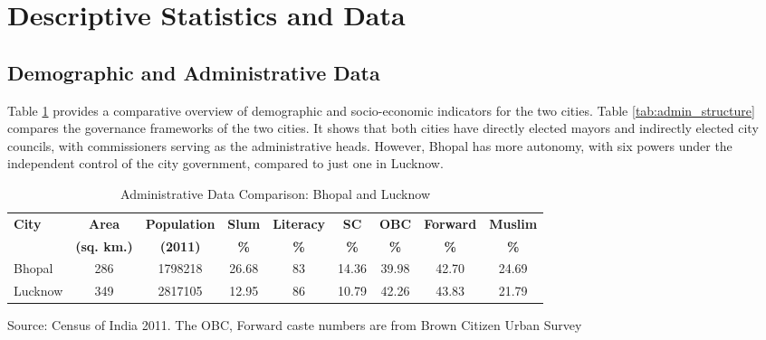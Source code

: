 \section{Descriptive Statistics and Data}

\subsection{Demographic and Administrative Data}

Table \ref{tab:admin_data} provides a comparative overview of demographic and socio-economic indicators for the two cities. Table \ref{tab:admin_structure} compares the governance frameworks of the two cities. It shows that both cities have directly elected mayors and indirectly elected city councils, with commissioners serving as the administrative heads. However, Bhopal has more autonomy, with six powers under the independent control of the city government, compared to just one in Lucknow.

\begin{table}[ht]
\centering
\caption{Administrative Data Comparison: Bhopal and Lucknow}
\label{tab:admin_data}
\begin{tabular}{|l|c|c|c|c|c|c|c|c|}
\hline
\textbf{City} & \textbf{Area} & \textbf{Population} & \textbf{Slum} & \textbf{Literacy} & \textbf{SC} & \textbf{OBC} & \textbf{Forward} & \textbf{Muslim} \\
 & \textbf{(sq. km.)} & \textbf{(2011)} & \textbf{\%} & \textbf{\%} & \textbf{\%} & \textbf{\%} & \textbf{\%} & \textbf{\%} \\
\hline
Bhopal & 286 & 1798218 & 26.68 & 83 & 14.36 & 39.98 & 42.70 & 24.69 \\
\hline
Lucknow & 349 & 2817105 & 12.95 & 86 & 10.79 & 42.26 & 43.83 & 21.79 \\
\hline
\end{tabular}
\raggedright
\small Source: Census of India 2011. The OBC, Forward caste numbers are from Brown Citizen Urban Survey
\end{table}

